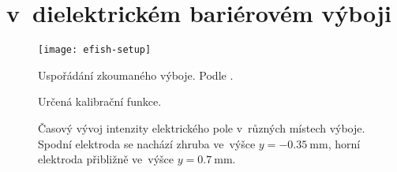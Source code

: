 \chapter[\EFISH]{{\EFISH} v~dielektrickém bariérovém výboji}

\newcommand\ypos{y}

\begin{figure}
	\texttt{[image: efish-setup]}
	\caption{Uspořádání zkoumaného výboje. Podle \cite{efish-nitrogen}.}
\end{figure}


\begin{figure}
	
	\caption{Určená kalibrační funkce.}
\end{figure}

\begin{figure}[p]
	\makebox[\textwidth]{}
	\caption{Časový vývoj intenzity elektrického pole
		v~různých místech výboje.
		Spodní elektroda se nachází zhruba ve~výšce
		$\ypos = \SI{-0.35}{\milli\metre}$,
		horní elektroda přibližně ve~výšce
		$\ypos = \SI{0.7}{\milli\metre}$.}
\end{figure}

